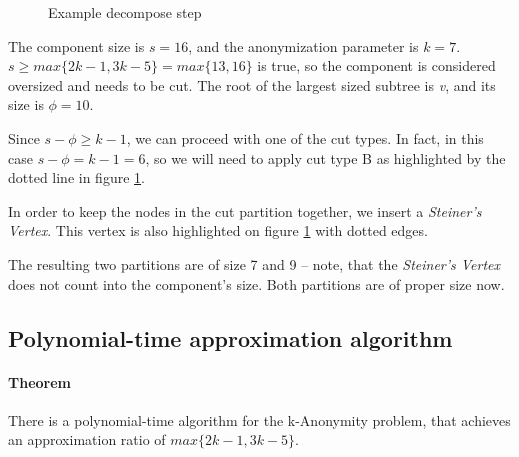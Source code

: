 \begin{figure}[H]

	\caption{Example decompose step}
	\label{fig:decompose_example}
\end{figure}

The component size is \(s=16\), and the anonymization parameter is \(k=7\). \(s \ge max\{2k-1,3k-5\}=max\{13,16\}\) is true, so the component is considered oversized and needs to be cut. The root of the largest sized subtree is \textit{v}, and its size is \(\phi=10\).

Since \(s-\phi \ge k-1\), we can proceed with one of the cut types. In fact, in this case \(s-\phi=k-1=6\), so we will need to apply cut type B as highlighted by the dotted line in figure \ref{fig:decompose_example}.

In order to keep the nodes in the cut partition together, we insert a \emph{Steiner's Vertex}. This vertex is also highlighted on figure \ref{fig:decompose_example} with dotted edges.

The resulting two partitions are of size 7 and 9 -- note, that the \emph{Steiner's Vertex} does not count into the component's size. Both partitions are of proper size now.

\subsection{Polynomial-time approximation algorithm}

\paragraph{Theorem}  There is a polynomial-time algorithm for the k-Anonymity problem, that achieves an approximation ratio of \(max\{2k-1, 3k-5\}\). \cite{aggarwal}

